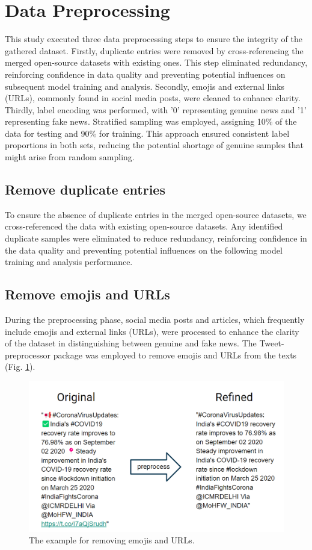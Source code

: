 \section{Data Preprocessing}
This study executed three data preprocessing steps to ensure the integrity of the gathered dataset. Firstly, duplicate entries were removed by cross-referencing the merged open-source datasets with existing ones. This step eliminated redundancy, reinforcing confidence in data quality and preventing potential influences on subsequent model training and analysis. Secondly, emojis and external links (URLs), commonly found in social media posts, were cleaned to enhance clarity. Thirdly, label encoding was performed, with '0' representing genuine news and '1' representing fake news. Stratified sampling was employed, assigning 10\% of the data for testing and 90\% for training. This approach ensured consistent label proportions in both sets, reducing the potential shortage of genuine samples that might arise from random sampling.

\subsection{Remove duplicate entries}
To ensure the absence of duplicate entries in the merged open-source datasets, we cross-referenced the data with existing open-source datasets. Any identified duplicate samples were eliminated to reduce redundancy, reinforcing confidence in the data quality and preventing potential influences on the following model training and analysis performance.
\subsection{Remove emojis and URLs}
During the preprocessing phase, social media posts and articles, which frequently include emojis and external links (URLs), were processed to enhance the clarity of the dataset in distinguishing between genuine and fake news. The Tweet-preprocessor package\cite{b5} was employed to remove emojis and URLs from the texts (Fig. \ref{fig:preprocessing}).

\begin{figure}
  \centering
  \includegraphics[width=1\columnwidth]{img/preprocessing.png}
  \caption{The example for removing emojis and URLs.} 
  \vspace{-0.4cm}
  \label{fig:preprocessing}
\end{figure}

